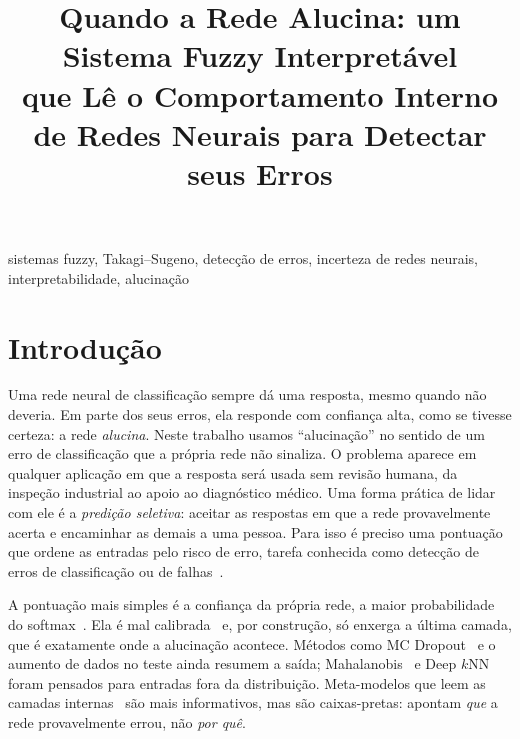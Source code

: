 \documentclass[conference,a4paper]{IEEEtran}
\begin{document}
\title{Quando a Rede Alucina: um Sistema Fuzzy Interpretável\\
que Lê o Comportamento Interno de Redes Neurais para Detectar seus Erros}

\author{}

\maketitle

\begin{abstract}
\end{abstract}

\begin{IEEEkeywords}
sistemas fuzzy, Takagi--Sugeno, detecção de erros, incerteza de redes neurais, interpretabilidade, alucinação
\end{IEEEkeywords}

\section{Introdução}

Uma rede neural de classificação sempre dá uma resposta, mesmo quando não deveria. Em parte dos seus erros, ela responde com confiança alta,
como se tivesse certeza: a rede \emph{alucina}. Neste trabalho usamos ``alucinação'' no sentido de um erro de classificação que a própria
rede não sinaliza. O problema aparece em qualquer aplicação em que a resposta será usada sem revisão humana, da inspeção industrial ao apoio
ao diagnóstico médico. Uma forma prática de lidar com ele é a \emph{predição seletiva}: aceitar as respostas em que a rede provavelmente
acerta e encaminhar as demais a uma pessoa. Para isso é preciso uma pontuação que ordene as entradas pelo risco de erro, tarefa conhecida
como detecção de erros de classificação ou de falhas~\cite{hendrycks2017,jaeger2023}.

A pontuação mais simples é a confiança da própria rede, a maior probabilidade do softmax~\cite{hendrycks2017}. Ela é mal calibrada~\cite{guo2017}
e, por construção, só enxerga a última camada, que é exatamente onde a alucinação acontece. Métodos como MC Dropout~\cite{gal2016} e o aumento
de dados no teste ainda resumem a saída; Mahalanobis~\cite{lee2018} e Deep $k$NN~\cite{papernot2018} foram pensados para entradas fora da
distribuição. Meta-modelos que leem as camadas internas~\cite{chen2019,font2025,gorbett2022} são mais informativos, mas são caixas-pretas:
apontam \emph{que} a rede provavelmente errou, não \emph{por quê}.
\end{document}
